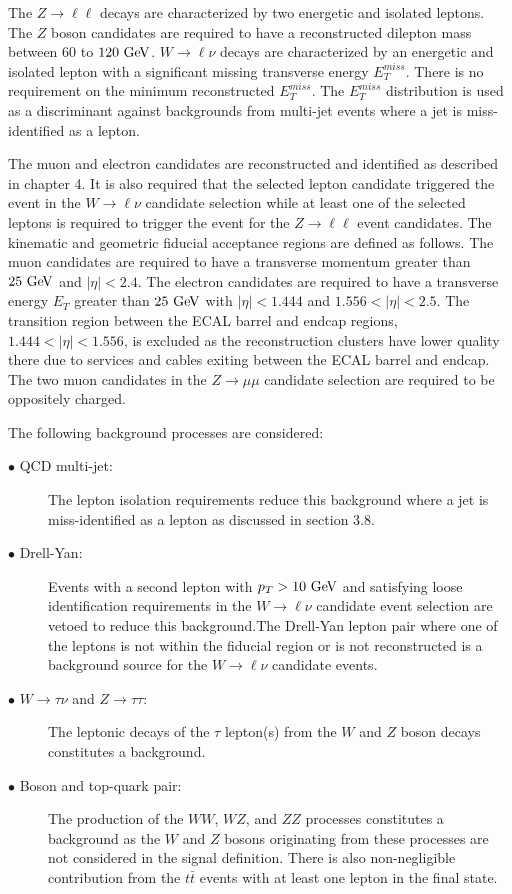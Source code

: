 The $Z \rightarrow \ell\ell$ decays are characterized by two energetic and isolated leptons. The $Z$ boson candidates are required to have a reconstructed dilepton mass between $60$ to $120~\mathrm{Ge\kern -0.1em V}$. $W \rightarrow \ell \nu$ decays are characterized by an energetic and isolated lepton with a significant missing transverse energy $E_{T}^{miss}$. There is no requirement on the minimum reconstructed $E_{T}^{miss}$. The $E_{T}^{miss}$ distribution is used as a discriminant against backgrounds from multi-jet events where a jet is miss-identified as a lepton.

The muon and electron candidates are reconstructed and identified as described in chapter 4. It is also required that the selected lepton candidate triggered the event in the $W\rightarrow \ell\nu$ candidate selection while at least one of the selected leptons is required to trigger the event for the $Z\rightarrow \ell\ell$ event candidates. The kinematic and geometric fiducial acceptance regions are defined as follows. The muon candidates are required to have a transverse momentum greater than $25~\mathrm{Ge\kern -0.1em V}$ and $|\eta|<2.4$. The electron candidates are required to have a transverse energy $E_{T}$ greater than $25~\mathrm{Ge\kern -0.1em V}$ with $|\eta|<1.444$ and $1.556<|\eta|<2.5$.  The transition region between the ECAL barrel and endcap regions, $1.444<|\eta|<1.556$, is excluded as the reconstruction clusters have lower quality there due to services and cables exiting between the ECAL barrel and endcap. The two muon candidates in the  $Z\rightarrow \mu\mu$ candidate selection are required to be oppositely charged.

The following background processes are considered:
\begin{description}
\item[$\bullet$ QCD multi-jet:] The lepton isolation requirements reduce this background where a jet is miss-identified as a lepton as discussed in section 3.8.  
\item[$\bullet$ Drell-Yan:] Events with a second lepton with $p_{T}>10~\mathrm{Ge\kern -0.1em V}$ and satisfying loose identification requirements in the $W \rightarrow \ell\nu$ candidate event selection are vetoed to reduce this background.The Drell-Yan lepton pair where one of the leptons is not within the fiducial region or is not reconstructed is a background source for the $W \rightarrow \ell\nu$ candidate events. 
\item[$\bullet$ $W\rightarrow \tau\nu$ and $Z\rightarrow \tau\tau$:] The leptonic decays of the $\tau$ lepton(s) from the $W$ and $Z$ boson decays constitutes a background. 
\item[$\bullet$ Boson and top-quark pair:] The production of the $WW$, $WZ$, and $ZZ$ processes constitutes a background as the $W$ and $Z$ bosons originating from these processes are not considered in the signal definition. There is also non-negligible contribution from the $t\bar{t}$ events with at least one lepton in the final state.
\end{description}    

